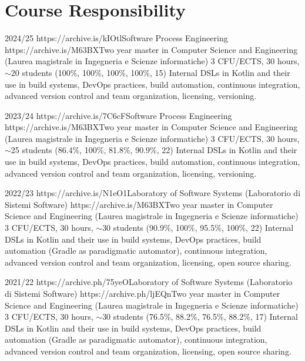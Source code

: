 \section{Course Responsibility}
\vspace{-2em}
\begin{outerlist}
    \item[2024/25]
        \unibocourse
        {https://archive.is/kIOtl}{Software Process Engineering}
        {https://archive.is/M63BX}{Two year master in Computer Science and Engineering (Laurea magistrale in Ingegneria e Scienze informatiche)}
        {3 CFU/ECTS, 30 hours, $\sim$20 students}
        {(100\%, 100\%, 100\%, 100\%, 15)}
        {Internal DSLs in Kotlin and their use in build systems, DevOps practices, build automation, continuous integration, advanced version control and team organization, licensing, versioning.}
    \item[2023/24]
        \unibocourse
        {https://archive.is/7C6cF}{Software Process Engineering}
        {https://archive.is/M63BX}{Two year master in Computer Science and Engineering (Laurea magistrale in Ingegneria e Scienze informatiche)}
        {3 CFU/ECTS, 30 hours, $\sim$25 students}
        {(86.4\%, 100\%, 81.8\%, 90.9\%, 22)}
        {Internal DSLs in Kotlin and their use in build systems, DevOps practices, build automation, continuous integration, advanced version control and team organization, licensing, versioning.}
    \item[2022/23]
        \unibocourse
        {https://archive.is/N1eO1}{Laboratory of Software Systems (Laboratorio di Sistemi Software)}
        {https://archive.is/M63BX}{Two year master in Computer Science and Engineering (Laurea magistrale in Ingegneria e Scienze informatiche)}
        {3 CFU/ECTS, 30 hours, $\sim$30 students}
        {(90.9\%, 100\%, 95.5\%, 100\%, 22)}
        {Internal DSLs in Kotlin and their use in build systems, DevOps practices, build automation (Gradle as paradigmatic automator), continuous integration, advanced version control and team organization, licensing, open source sharing.}
    \item[2021/22]
        \unibocourse
        {https://archive.ph/75yeO}{Laboratory of Software Systems (Laboratorio di Sistemi Software)}
        {https://archive.ph/ljEQn}{Two year master in Computer Science and Engineering (Laurea magistrale in Ingegneria e Scienze informatiche)}
        {3 CFU/ECTS, 30 hours, $\sim$30 students}
        {(76.5\%, 88.2\%, 76.5\%, 88.2\%, 17)}
        {Internal DSLs in Kotlin and their use in build systems, DevOps practices, build automation (Gradle as paradigmatic automator), continuous integration, advanced version control and team organization, licensing, open source sharing.}

\end{outerlist}
